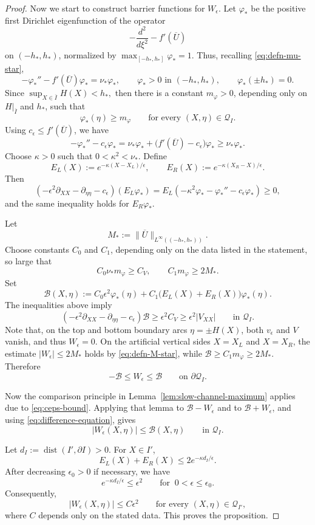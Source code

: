 \documentclass[10pt,a4paper]{amsart}
\begin{document}
\begin{proof}
Now we start to construct barrier functions for $W_\epsilon$. 
Let $\varphi_*$ be the positive first Dirichlet eigenfunction of the operator
$$-\frac{d^2}{d\xi^2}-f'(\overline U)$$
on $(-h_*,h_*)$, normalized by $\max_{[-h_*,h_*]}\varphi_*=1. $
Thus, recalling \eqref{eq:defn-mu-star},
$$
-\varphi_*''-f'(\overline U)\varphi_*=\nu_*\varphi_*,
\qquad
\varphi_*>0\text{ in }(-h_*,h_*),
\qquad
\varphi_*(\pm h_*)=0.
$$
Since $\sup_{X\in\overline I}H(X)<h_*,$ then
there is a constant $m_\varphi>0$, depending only on $H|_{\overline I}$ and $h_*$, such that
$$
\varphi_*(\eta)\ge m_\varphi
\qquad\text{for every }(X,\eta)\in\mathcal Q_I.
$$
Using $c_\epsilon\le f'(\overline U)$, we have
$$
-\varphi_*''-c_\epsilon\varphi_*
= \nu_*\varphi_*+\bigl(f'(\overline U)-c_\epsilon\bigr)\varphi_*
\ge \nu_*\varphi_*.
$$
Choose $\kappa>0$ such that $0<\kappa^2<\nu_*.$
Define
$$
E_L(X):=e^{-\kappa(X-X_L)/\epsilon},
\qquad
E_R(X):=e^{-\kappa(X_R-X)/\epsilon}.
$$
Then
$$
\left(-\epsilon^2\partial_{XX}-\partial_{\eta\eta}-c_\epsilon\right)(E_L\varphi_*)
=E_L\left(-\kappa^2\varphi_*-\varphi_*''-c_\epsilon\varphi_*\right)
\ge 0,
$$
and the same inequality holds for $E_R\varphi_*$.

Let
\begin{equation}\label{eq:defn-M-star}
    M_*:=\|\overline U\|_{L^\infty((-h_*,h_*))}.
\end{equation}
Choose constants $C_0$ and $C_1$, depending only on the data listed in the
statement, so large that
$$
C_0\nu_* m_\varphi\ge C_V,
\qquad
C_1 m_\varphi\ge 2M_*.
$$
Set
$$
\mathcal B(X,\eta):=
C_0\epsilon^2\varphi_*(\eta)
+C_1\bigl(E_L(X)+E_R(X)\bigr)\varphi_*(\eta).
$$
The inequalities above imply
$$
\left(-\epsilon^2\partial_{XX}-\partial_{\eta\eta}-c_\epsilon\right) \mathcal B
\ge \epsilon^2 C_V
\ge \epsilon^2 \left| V_{XX}\right|
\qquad\text{in }\mathcal Q_I.
$$
Note that, on the top and bottom boundary arcs $\eta=\pm H(X)$, both $v_\epsilon$ and
$V$ vanish, and thus $W_\epsilon=0$.  On the artificial vertical sides $X=X_L$ and $X=X_R$,
the estimate $|W_\epsilon|\le2 M_*$ holds by \eqref{eq:defn-M-star}, while $\mathcal B\ge C_1m_\varphi\ge2 M_*$.
Therefore
$$
-\mathcal B\le W_\epsilon\le\mathcal B
\qquad\text{on }\partial\mathcal Q_I.
$$

Now the comparison principle in Lemma~\ref{lem:slow-channel-maximum} applies
due to \eqref{eq:ceps-bound}.
Applying that lemma to $\mathcal B-W_\epsilon$ and to
$\mathcal B+W_\epsilon$, and using \eqref{eq:difference-equation}, gives
$$
|W_\epsilon(X,\eta)|\le\mathcal B(X,\eta)
\qquad\text{in }\mathcal Q_I.
$$

Let $d_I:=\operatorname{dist}(I',\partial I)>0.$
For $X\in I'$,
$$
E_L(X)+E_R(X)
\le 2e^{-\kappa d_I/\epsilon}.
$$
After decreasing $\epsilon_0>0$ if necessary, we have
$$
e^{-\kappa d_I/\epsilon}\le \epsilon^2
\qquad\text{for }\ 0<\epsilon\le\epsilon_0.
$$
Consequently,
$$
|W_\epsilon(X,\eta)|\le C\epsilon^2
\qquad\text{for every }(X,\eta)\in\mathcal Q_{I'},
$$
where $C$ depends only on the stated data.  This proves the proposition.
\end{proof}
\end{document}
